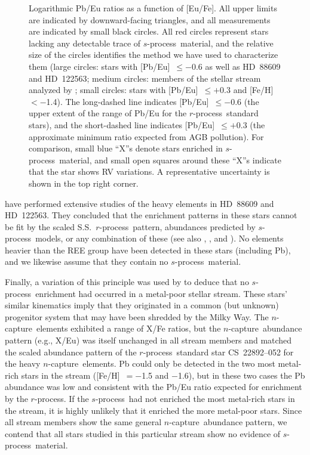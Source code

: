 \documentclass{emulateapj}
\def\rpro{\mbox{$r$-process}}
\def\spro{\mbox{$s$-process}}
\def\ncap{\mbox{$n$-capture}}
\begin{document}
\begin{figure}
\begin{center}
\end{center}
\caption{
\label{pbeuplot}
Logarithmic Pb/Eu ratios as a function of [Eu/Fe].
All upper limits are indicated by downward-facing triangles, 
and all measurements are indicated by small black circles.
All red circles represent stars lacking any detectable
trace of \spro\ material, and
the relative size of the circles identifies the method
we have used to characterize them
(large circles: 
stars with [Pb/Eu]~$\leq -0.6$ as well as 
\mbox{HD~88609} and \mbox{HD~122563};
medium circles:
members of the stellar stream analyzed by \citealt{roederer10a};
small circles: 
stars with [Pb/Eu]~$\leq +0.3$
and [Fe/H]~$< -$1.4).
The long-dashed line indicates 
[Pb/Eu]~$\leq -0.6$
(the upper extent
of the range of Pb/Eu for the \rpro\ standard stars),
and the short-dashed line indicates [Pb/Eu]~$\leq +0.3$
(the approximate minimum ratio expected from AGB pollution).
For comparison, 
small blue ``X''s denote stars enriched in \spro\ material,
and small open squares around these ``X''s indicate that
the star shows RV variations.
A representative uncertainty is shown 
in the top right corner.
}
\end{figure}

\citet{honda06,honda07} have performed extensive studies of 
the heavy elements in \mbox{HD~88609} and \mbox{HD~122563}.
They concluded
that the enrichment patterns in these stars cannot be fit by 
the scaled S.S.\ \rpro\ pattern, abundances predicted by \spro\ models,
or any combination of these
(see also \citealt{sneden83}, \citealt{farouqi08}, and \citealt{kratz08a}).
No elements heavier than the REE group have been detected 
in these stars (including Pb), 
and we likewise assume that they contain no \spro\ material.

Finally, a variation of this principle was used by \citet{roederer10a} to 
deduce that no \spro\ enrichment had occurred in a metal-poor
stellar stream.
These stars' similar kinematics imply that they originated
in a common (but unknown)
progenitor system that may have been shredded by the Milky Way.
The \ncap\ elements exhibited a range of X/Fe ratios, but the 
\ncap\ abundance pattern (e.g., X/Eu) was itself unchanged in all
stream members and matched the scaled abundance pattern 
of the \rpro\ standard star \mbox{CS~22892--052} for the
heavy \ncap\ elements.
Pb could only be detected in the two most metal-rich stars in the stream
([Fe/H]~$= -$1.5 and $-$1.6), but in these two cases the Pb 
abundance was low and consistent with the Pb/Eu ratio expected 
for enrichment by the \rpro.
If the \spro\ had not enriched the most metal-rich stars in the stream,
it is highly unlikely that it enriched the more metal-poor stars.
Since all stream members show the same general \ncap\ abundance pattern,
we contend that all stars studied in this particular stream show no evidence
of \spro\ material.
\end{document}
